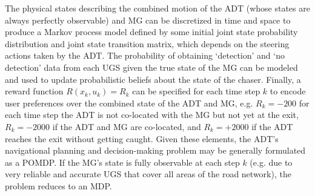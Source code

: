 The physical states describing the combined motion of the ADT (whose states are always perfectly observable) and MG can be discretized in time and space to produce a Markov process model defined by some initial joint state probability distribution and joint state transition matrix, which depends on the steering actions taken by the ADT. The probability of obtaining `detection' and `no detection' data from each UGS given the true state of the MG can be modeled and used to update probabilistic beliefs about the state of the chaser. Finally, a reward function $R(x_k,u_k) = R_k$ can be specified for each time step $k$ to encode user preferences over the combined state of the ADT and MG, e.g. $R_k = -200$ for each time step the ADT is not co-located with the MG but not yet at the exit, $R_k= -2000$ if the ADT and MG are co-located, and $R_k=+2000$ if the ADT reaches the exit without getting caught. Given these elements, the ADT's navigational planning and decision-making problem may be generally formulated as a POMDP. If the MG's state is fully observable at each step $k$ (e.g. due to very reliable and accurate UGS that cover all areas of the road network), the problem reduces to an MDP. 
